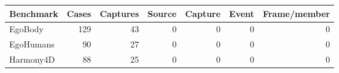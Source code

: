 \begin{tabular}{lrrrrrr}
\toprule
Benchmark & Cases & Captures & Source & Capture & Event & Frame/member \\
\midrule
    EgoBody & 129 & 43 & 0 & 0 & 0 & 0 \\
    EgoHumans & 90 & 27 & 0 & 0 & 0 & 0 \\
    Harmony4D & 88 & 25 & 0 & 0 & 0 & 0 \\
\bottomrule
\end{tabular}
